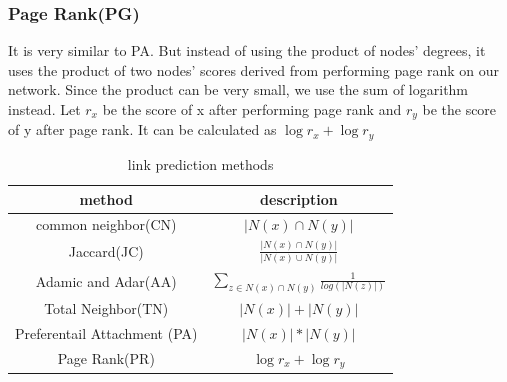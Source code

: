 \documentclass[12pt]{article}
\begin{document}
	\subsubsection{Page Rank(PG)}
	It is very similar to PA. But instead of using the product of nodes' degrees, it uses the product of two nodes' scores derived from performing page rank on our network. Since the product can be very small, we use the sum of logarithm instead. Let $r_x$ be the score of x after performing page rank and $r_y$ be the score of y after page rank. It can be calculated as $\log{r_x} + \log{r_y}$
	\begin{table}
		\begin{center}
			\begin{tabular}{|c|c|}
				\hline
				method & description \\
				\hline
				common neighbor(CN) & $|N(x) \cap N(y)|$ \\
				Jaccard(JC) & $\frac{|N(x) \cap N(y)|}{|N(x) \cup N(y)|}$ \\
				Adamic and Adar(AA) & $\sum_{z \in N(x) \cap N(y)}{\frac{1}{log(|N(z)|)}}$ \\
				Total Neighbor(TN) & $|N(x)| + |N(y)|$ \\
				Preferentail Attachment (PA) & $|N(x)| * |N(y)|$ \\
				Page Rank(PR)  & $\log{r_x} + \log{r_y}$ \\	
				\hline
			\end{tabular}
		\end{center}
		\caption{link prediction methods}
		\label{tab:method}
	\end{table}
	
\end{document}
